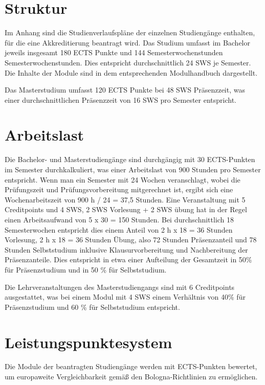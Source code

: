 \section{Struktur}\label{struktur}

Im Anhang sind die Studienverlaufspläne der einzelnen Studiengänge
enthalten, für die eine Akkreditierung beantragt wird. Das Studium
umfasst im Bachelor jeweils insgesamt 180 ECTS Punkte und 144
Semesterwochenstunden Semesterwochenstunden. Dies entspricht
durchschnittlich 24 SWS je Semester. Die Inhalte der Module sind in dem
entsprechenden Modulhandbuch dargestellt.

Das Masterstudium umfasst 120 ECTS Punkte bei 48 SWS Präsenzzeit, was
einer durchschnittlichen Präsenzzeit von 16 SWS pro Semester entspricht.

\section{Arbeitslast}\label{arbeitslast}

Die Bachelor- und Masterstudiengänge sind durchgängig mit 30
ECTS-Punkten im Semester durchkalkuliert, was einer Arbeitslast von 900
Stunden pro Semester entspricht. Wenn man ein Semester mit 24 Wochen
veranschlagt, wobei die Prüfungszeit und Prüfungsvorbereitung
mitgerechnet ist, ergibt sich eine Wochenarbeitszeit von 900 h / 24 =
37,5 Stunden. Eine Veranstaltung mit 5 Creditpoints und 4 SWS, 2 SWS
Vorlesung + 2 SWS übung hat in der Regel einen Arbeitsaufwand von 5 x 30
= 150 Stunden. Bei durchschnittlich 18 Semesterwochen entspricht dies
einem Anteil von 2 h x 18 = 36 Stunden Vorlesung, 2 h x 18 = 36 Stunden
Übung, also 72 Stunden Präsenzanteil und 78 Stunden Selbststudium
inklusive Klausurvorbereitung und Nachbereitung der Präsenzanteile. Dies
entspricht in etwa einer Aufteilung der Gesamtzeit in 50\% für
Präsenzstudium und in 50 \% für Selbststudium.

Die Lehrveranstaltungen des Masterstudiengangs sind mit 6 Creditpoints
ausgestattet, was bei einem Modul mit 4 SWS einem Verhältnis von 40\%
für Präsenzstudium und 60 \% für Selbststudium entspricht.

\section{Leistungspunktesystem}\label{leistungspunktesystem}

Die Module der beantragten Studiengänge werden mit ECTS-Punkten
bewertet, um europaweite Vergleichbarkeit gemäß den Bologna-Richtlinien
zu ermöglichen.


